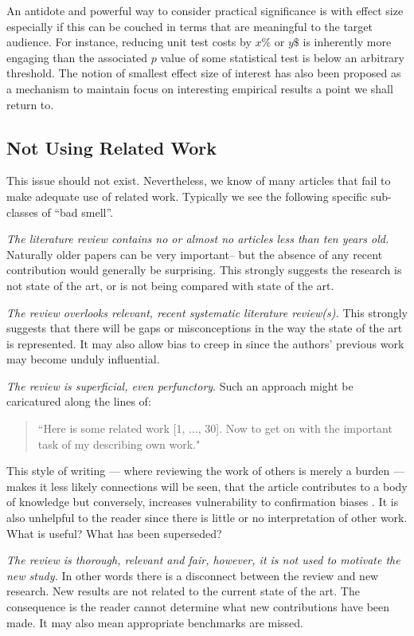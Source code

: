 \documentclass[preprint,10pt]{elsarticle}
\newcommand{\RED}{\color{red}}
\newcommand{\BLACK}{\color{black}}
\begin{document}
An antidote and powerful way to consider practical significance is with effect size \cite{Elli10} especially if this can be couched in terms that are meaningful to the target audience.  For instance, reducing unit test costs by $x\%$ or $y\$ $ is inherently more engaging than the associated $p$ value of some statistical test is below an arbitrary threshold. The notion of smallest effect size of interest has also been proposed as a mechanism to maintain focus on interesting empirical results \cite{Lake17} a point we shall return to.


\subsection{Not Using Related Work}
This issue should not exist. Nevertheless, we know of many articles that fail to make adequate use of related work. Typically we see the following specific sub-classes of ``bad smell''.

 {\em The literature review contains no or almost no articles less than ten years old.}  \RED Naturally older papers can be very important-- but the absence of any recent contribution would generally be surprising. \BLACK This strongly suggests the research is not state of the art, or is not being compared with state of the art.

{\em The review overlooks relevant, recent systematic literature review(s).}  This strongly suggests that there will be gaps or misconceptions in the way the state of the art is represented.  It may also allow bias to creep in since the authors' previous work may become unduly influential.

{\em The review is superficial, even perfunctory}. Such an approach might be caricatured along the lines of: \begin{quote}
    ``Here is some related work [1, ..., 30].  Now to get on with the important task of my describing own work."
\end{quote}
This style of writing --- where reviewing the work of others is merely a burden --- makes it less likely connections will be seen, that the article contributes to a body of knowledge but conversely, increases vulnerability to confirmation biases \cite{Nick98}.  It is also unhelpful to the reader since there is little or no interpretation of other work.  What is useful?  What has been superseded?

{\em The review is thorough, relevant and fair, however, it is not used to motivate the new study. } In other words there is a disconnect between the review  and new research. New results are not related to the current state of the art.  The consequence is the reader cannot determine what new contributions have been made.  It may also mean appropriate benchmarks are missed.
\end{document}
